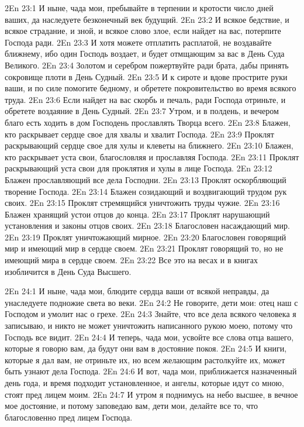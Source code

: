 \vs 2En 23:1
И ныне, чада мои, пребывайте в терпении и кротости число дней ваших, да наследуете безконечный век будущий.
\vs 2En 23:2
И всякое бедствие, и всякое страдание, и зной, и всякое слово злое, если найдет на вас, потерпите Господа ради.
\vs 2En 23:3
И хотя можете отплатить расплатой, не воздавайте ближнему, ибо один Господь воздает, и будет отмщающим за вас в День Суда Великого.
\vs 2En 23:4
Золотом и серебром пожертвуйте ради брата, дабы принять сокровище плоти в День Судный.
\vs 2En 23:5
И к сироте и вдове прострите руки ваши, и по силе помогите бедному, и обретете покровительство во время всякого труда.
\vs 2En 23:6
Если найдет на вас скорбь и печаль, ради Господа отриньте, и обретете воздаяние в День Судный.
\vs 2En 23:7
Утром, и в полдень, и вечером благо есть ходить в дом Господень прославлять Творца всего.
\vs 2En 23:8
Блажен, кто раскрывает сердце свое для хвалы и хвалит Господа.
\vs 2En 23:9
Проклят раскрывающий сердце свое для хулы и клеветы на ближнего.
\vs 2En 23:10
Блажен, кто раскрывает уста свои, благословляя и прославляя Господа.
\vs 2En 23:11
Проклят раскрывающий уста свои для проклятия и хулы в лице Господа.
\vs 2En 23:12
Блажен прославляющий все дела Господни.
\vs 2En 23:13
Проклят оскорбляющий творение Господа.
\vs 2En 23:14
Блажен созидающий и воздвигающий трудом рук своих.
\vs 2En 23:15
Проклят стремящийся уничтожить труды чужие.
\vs 2En 23:16
Блажен хранящий устои отцов до конца.
\vs 2En 23:17
Проклят нарушающий установления и законы отцов своих.
\vs 2En 23:18
Благословен насаждающий мир.
\vs 2En 23:19
Проклят уничтожающий мирное.
\vs 2En 23:20
Благословен говорящий мир и имеющий мир в сердце своем.
\vs 2En 23:21
Проклят говорящий то, но не имеющий мира в сердце своем.
\vs 2En 23:22
Все это на весах и в книгах изобличится в День Суда Высшего.

\vs 2En 24:1
И ныне, чада мои, блюдите сердца ваши от всякой неправды, да унаследуете подножие света во веки.
\vs 2En 24:2
Не говорите, дети мои: отец наш с Господом и умолит нас о грехе.
\vs 2En 24:3
Знайте, что все дела всякого человека я записываю, и никто не может уничтожить написанного рукою моею, потому что Господь все видит.
\vs 2En 24:4
И теперь, чада мои, усвойте все слова отца вашего, которые я говорю вам, да будут они вам в достояние покоя.
\vs 2En 24:5
И книги, которые я дал вам, не отриньте их, но всем желающим растолкуйте их, может быть узнают дела Господа.
\vs 2En 24:6
И вот, чада мои, приближается назначенный день года, и время подходит установленное, и ангелы, которые идут со мною, стоят пред лицем моим.
\vs 2En 24:7
И утром я поднимусь на небо высшее, в вечное мое достояние, и потому заповедаю вам, дети мои, делайте все то, что благословенно пред лицем Господа.

